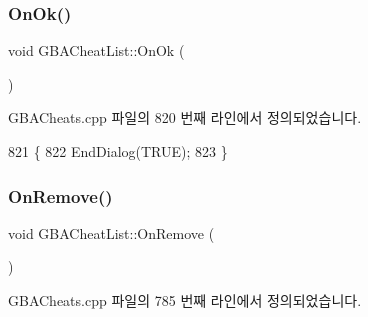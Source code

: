 \subsubsection{\texorpdfstring{On\+Ok()}{OnOk()}}
{\footnotesize\ttfamily void G\+B\+A\+Cheat\+List\+::\+On\+Ok (\begin{DoxyParamCaption}{ }\end{DoxyParamCaption})\hspace{0.3cm}{\ttfamily [protected]}}



G\+B\+A\+Cheats.\+cpp 파일의 820 번째 라인에서 정의되었습니다.


\begin{DoxyCode}
821 \{
822   EndDialog(TRUE);
823 \}
\end{DoxyCode}
\mbox{\label{class_g_b_a_cheat_list_ae8a0358fd127292dda615a647a6f36c9}} 
\subsubsection{\texorpdfstring{On\+Remove()}{OnRemove()}}
{\footnotesize\ttfamily void G\+B\+A\+Cheat\+List\+::\+On\+Remove (\begin{DoxyParamCaption}{ }\end{DoxyParamCaption})\hspace{0.3cm}{\ttfamily [protected]}}



G\+B\+A\+Cheats.\+cpp 파일의 785 번째 라인에서 정의되었습니다.


